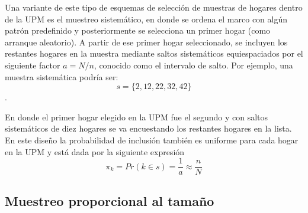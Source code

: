 \documentclass[12pt,spanish,]{book}
\begin{document}
Una variante de este tipo de esquemas de selección de muestras de hogares dentro de la UPM es el muestreo sistemático, en donde se ordena el marco con algún patrón predefinido y posteriormente se selecciona un primer hogar (como arranque aleatorio). A partir de ese primer hogar seleccionado, se incluyen los restantes hogares en la muestra mediante saltos sistemáticos equiespaciados por el siguiente factor \(a = N/n\), conocido como el intervalo de salto. Por ejemplo, una muestra sistemática podría ser:
\[s=\{2, 12, 22, 32, 42\}\].

En donde el primer hogar elegido en la UPM fue el segundo y con saltos sistemáticos de diez hogares se va encuestando los restantes hogares en la lista. En este diseño la probabilidad de inclusión también es uniforme para cada hogar en la UPM y está dada por la siguiente expresión
\[\pi_k = Pr(k \in s) = \frac{1}{a} \approx \frac{n}{N}\]

\hypertarget{muestreo-proporcional-al-tamano}{%
\subsection*{Muestreo proporcional al tamaño}\label{muestreo-proporcional-al-tamano}}
\end{document}

